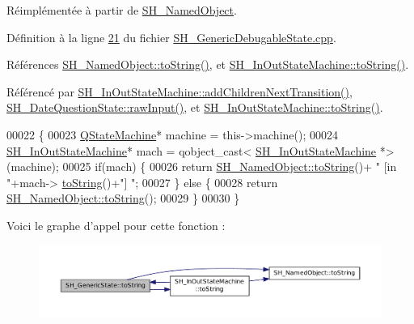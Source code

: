 Réimplémentée à partir de \hyperlink{classSH__NamedObject_af73e97f6476ca1ef3a22b159d179f5e7}{S\-H\-\_\-\-Named\-Object}.



Définition à la ligne \hyperlink{SH__GenericDebugableState_8cpp_source_l00021}{21} du fichier \hyperlink{SH__GenericDebugableState_8cpp_source}{S\-H\-\_\-\-Generic\-Debugable\-State.\-cpp}.



Références \hyperlink{classSH__NamedObject_af73e97f6476ca1ef3a22b159d179f5e7}{S\-H\-\_\-\-Named\-Object\-::to\-String()}, et \hyperlink{classSH__InOutStateMachine_a60ecd7de03d948e2d1e9cbedb5c3e5fa}{S\-H\-\_\-\-In\-Out\-State\-Machine\-::to\-String()}.



Référencé par \hyperlink{classSH__InOutStateMachine_a689e5513ef6ef3fc1598efacd413372e}{S\-H\-\_\-\-In\-Out\-State\-Machine\-::add\-Children\-Next\-Transition()}, \hyperlink{classSH__DateQuestionState_ac72e5b6b416614631032ff643d3c180e}{S\-H\-\_\-\-Date\-Question\-State\-::raw\-Input()}, et \hyperlink{classSH__InOutStateMachine_a60ecd7de03d948e2d1e9cbedb5c3e5fa}{S\-H\-\_\-\-In\-Out\-State\-Machine\-::to\-String()}.


\begin{DoxyCode}
00022 \{
00023     \hyperlink{classQStateMachine}{QStateMachine}* machine = this->machine();
00024     \hyperlink{classSH__InOutStateMachine}{SH\_InOutStateMachine}* mach = qobject\_cast<
      \hyperlink{classSH__InOutStateMachine}{SH\_InOutStateMachine} *>(machine);
00025     \textcolor{keywordflow}{if}(mach) \{
00026         \textcolor{keywordflow}{return} \hyperlink{classSH__NamedObject_af73e97f6476ca1ef3a22b159d179f5e7}{SH\_NamedObject::toString}()+ \textcolor{stringliteral}{" [in "}+mach->
      \hyperlink{classSH__InOutStateMachine_a60ecd7de03d948e2d1e9cbedb5c3e5fa}{toString}()+\textcolor{stringliteral}{"] "};
00027     \} \textcolor{keywordflow}{else} \{
00028         \textcolor{keywordflow}{return} \hyperlink{classSH__NamedObject_af73e97f6476ca1ef3a22b159d179f5e7}{SH\_NamedObject::toString}();
00029     \}
00030 \}
\end{DoxyCode}


Voici le graphe d'appel pour cette fonction \-:
\nopagebreak
\begin{figure}[H]
\begin{center}
\leavevmode
\includegraphics[width=350pt]{classSH__GenericState_a5480c5ee725fd801d8f6292cd4c803b8_cgraph}
\end{center}
\end{figure}




